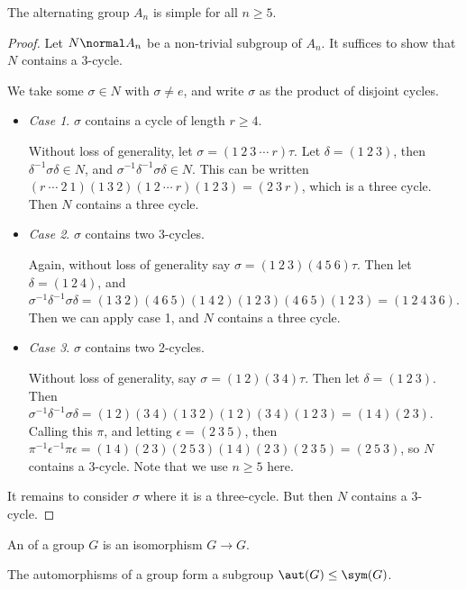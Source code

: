\documentclass[a4paper]{scrartcl}
\begin{document}
\begin{theorem}[$A_n$ is Simple]
The alternating group $A_n$ is simple for all $n \geq 5$.
\end{theorem}
\begin{proof}
	Let $N \normal A_n$ be a non-trivial subgroup of $A_n$. It suffices to show that $N$ contains a $3$-cycle.
	
	We take some $\sigma \in N$ with $\sigma \neq e$, and write $\sigma$ as the product of disjoint cycles.

	\begin{itemize}
		\item \emph{Case 1}. $\sigma$ contains a cycle of length $r \geq 4$.
	
		Without loss of generality, let $\sigma = (1\ 2\ 3\ \cdots\ r)\tau$. Let $\delta = (1\ 2\ 3)$, then $\delta^{-1} \sigma \delta \in N$, and $\sigma^{-1}\delta^{-1} \sigma \delta \in N$. This can be written $(r\ \cdots\ 2\ 1)(1\ 3\ 2)(1\ 2\ \cdots\ r)(1\ 2\ 3) = (2\ 3\ r)$, which is a three cycle. Then $N$ contains a three cycle.

		\item \emph{Case 2}. $\sigma$ contains two 3-cycles.
		
		Again, without loss of generality say $\sigma = (1\ 2\ 3)(4\ 5\ 6)\tau$. Then let $\delta = (1\ 2\ 4)$, and $\sigma^{-1}\delta^{-1}\sigma \delta = (1\ 3\ 2)(4\ 6\ 5) (1\ 4\ 2)(1\ 2\ 3)(4\ 6\ 5)(1\ 2\ 3) = (1\ 2\ 4\ 3\ 6)$. Then we can apply case 1, and $N$ contains a three cycle.
		\item \emph{Case 3}. $\sigma$ contains two 2-cycles.
		
		Without loss of generality, say $\sigma = (1\ 2)(3\ 4) \tau$. Then let $\delta = (1\ 2\ 3)$. Then $\sigma^{-1}\delta^{-1} \sigma \delta = (1\ 2)(3\ 4)(1\ 3\ 2)(1\ 2)(3\ 4)(1\ 2\ 3) = (1\ 4)(2\ 3)$. Calling this $\pi$, and letting $\epsilon = (2\ 3\ 5)$, then $\pi^{-1} \epsilon^{-1} \pi \epsilon = (1\ 4)(2\ 3)(2\ 5\ 3)(1\ 4)(2\ 3)(2\ 3\ 5) = (2\ 5\ 3)$, so $N$ contains a $3$-cycle. Note that we use $n \geq 5$ here. 
	\end{itemize}
	It remains to consider $\sigma$ where it is a three-cycle. But then $N$ contains a 3-cycle.
\end{proof}

\begin{definition}[Automorphism]
	An  of a group $G$ is an isomorphism $G \rightarrow G$.
\end{definition}

The automorphisms of a group form a subgroup $\aut(G) \leq \sym(G)$.
\end{document}
